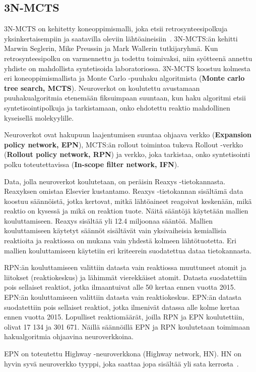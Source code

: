 \documentclass[finnish,twoside,censored,subject,sw-line]{HYthesisML}
\begin{document}
\subsection{3N-MCTS}

3N-MCTS on kehitetty koneoppimismalli, joka etsii retrosynteesipolkuja yksinkertaisempiin ja saatavilla oleviin lähtöaineisiin~\cite{SeglerMarwinHS2018Pcsw}.
3N-MCTS:än kehitti Marwin Seglerin, Mike Preussin ja Mark Wallerin tutkijaryhmä.
Kun retrosynteesipolku on varmennettu ja todettu toimivaksi, niin syötteenä annettu yhdiste on mahdollista syntetisoida laboratoriossa.
3N-MCTS koostuu kolmesta eri koneoppimismallista ja Monte Carlo -puuhaku algoritmista (\textbf{Monte carlo tree search, MCTS}).
Neuroverkot on koulutettu avustamaan puuhakualgoritmia etenemään fiksuimpaan suuntaan, kun haku algoritmi etsii syntetisointipolkuja ja tarkistamaan, onko ehdotettu reaktio mahdollinen kyseisellä molekyylille.

Neuroverkot ovat hakupuun laajentumisen suuntaa ohjaava verkko (\textbf{Expansion policy network, EPN}),
MCTS:än rollout toimintoa tukeva Rollout -verkko (\textbf{Rollout policy network, RPN})
ja verkko, joka tarkistaa, onko syntetisointi polku toteutettavissa (\textbf{In-scope filter network, IFN}).

Data, jolla neuroverkot koulutetaan, on peräisin Reaxys -tietokannasta. Reaxyksen omistaa Elsevier kustantamo. Reaxys -tietokannan sisältämä data koostuu
säännöistä, jotka kertovat, mitkä lähtöaineet reagoivat keskenään, mikä reaktio on kysessä ja mikä on reaktion
tuote. Näitä sääntöjä käytetään mallien kouluttamiseen. Reaxys sisältää yli 12.4 miljoonaa sääntöä. Mallien
kouluttamiseen käytetyt säännöt sisältävät vain yksivaiheisia kemiallisia reaktioita ja reaktiossa on mukana vain
yhdestä kolmeen lähtötuotetta. Eri mallien kouluttamiseen käytetiin eri kriteerein suodatettua dataa tietokannasta.

RPN:än kouluttamiseen valittiin datasta vain reaktiossa muuttuneet atomit ja liitokset (reaktiokeskus)
ja lähimmät vierekkäiset atomit. Datasta suodatettiin pois sellaiset reaktiot, jotka ilmaantuivat
alle 50 kertaa ennen vuotta 2015. EPN:än kouluttamiseen valittiin datasta vain reaktiokeskus.
EPN:än datasta suodatettiin pois sellaiset reaktiot, jotka ilmenivät datassa alle kolme kertaa ennen vuotta
2015. Lopulliset reaktiomäärät, joilla RPN ja EPN koulutettiin, olivat 17 134 ja 301 671. Näillä säännöillä
EPN ja RPN koulutetaan toimimaan hakualgoritmia ohjaavina neuroverkkoina.

EPN on toteutettu Highway -neuroverkkona (Highway network, HN). HN on hyvin syvä neuroverkko
tyyppi, joka saattaa jopa sisältää yli sata kerrosta~\cite{VeryDeepNetworks}.
\end{document}
